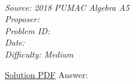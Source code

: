 \SSbreak\\
\emph{Source: 2018 PUMAC Algebra A5}\\
\emph{Proposer: \Pchan}\\ %
\emph{Problem ID:}\\
\emph{Date: }\\
\emph{Difficulty: Medium}\\
\SSbreak

\bigskip

\begin{solution}\hfil\medskip
	
	\href{https://static1.squarespace.com/static/570450471d07c094a39efaed/t/5bfb8c2570a6ad835e78ca0d/1543212069335/Algebra+A+Solutions.pdf}{Solution PDF} Answer: 
\end{solution}\bigskip
